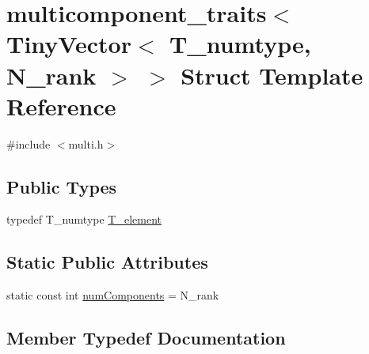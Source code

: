 \hypertarget{structmulticomponent__traits_3_01TinyVector_3_01T__numtype_00_01N__rank_01_4_01_4}{}\section{multicomponent\+\_\+traits$<$ Tiny\+Vector$<$ T\+\_\+numtype, N\+\_\+rank $>$ $>$ Struct Template Reference}
\label{structmulticomponent__traits_3_01TinyVector_3_01T__numtype_00_01N__rank_01_4_01_4}


{\ttfamily \#include $<$multi.\+h$>$}

\subsection*{Public Types}
\begin{DoxyCompactItemize}
\item 
typedef T\+\_\+numtype \hyperlink{structmulticomponent__traits_3_01TinyVector_3_01T__numtype_00_01N__rank_01_4_01_4_a07426ad661a9804207050bd7a443951c}{T\+\_\+element}
\end{DoxyCompactItemize}
\subsection*{Static Public Attributes}
\begin{DoxyCompactItemize}
\item 
static const int \hyperlink{structmulticomponent__traits_3_01TinyVector_3_01T__numtype_00_01N__rank_01_4_01_4_acd0c3944c159c66aec3cf7536efc5ae2}{num\+Components} = N\+\_\+rank
\end{DoxyCompactItemize}


\subsection{Member Typedef Documentation}
\hypertarget{structmulticomponent__traits_3_01TinyVector_3_01T__numtype_00_01N__rank_01_4_01_4_a07426ad661a9804207050bd7a443951c}{}
